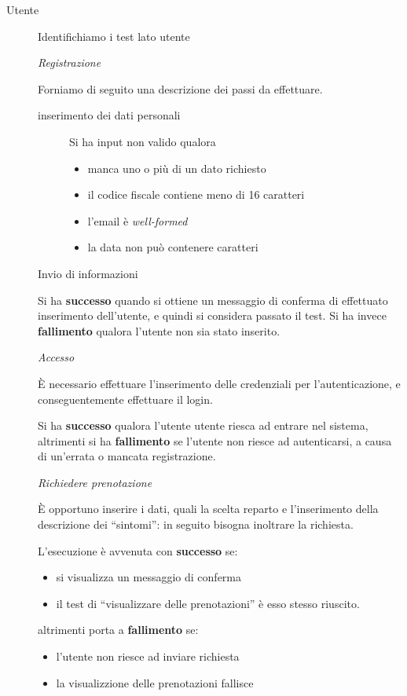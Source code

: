 \begin{description}
\item[Utente]

Identifichiamo i test lato utente

\begin{itemize}
 \diam \textit{Registrazione}
 
  Forniamo di seguito una descrizione dei passi da effettuare.
  \begin{description}
  
  \item[inserimento dei dati personali] Si ha input non valido qualora
  \begin{itemize}
  \item manca uno o più di un dato richiesto
  \item il codice fiscale contiene meno di 16 caratteri
  \item l'email è \textit{well-formed}
  \item la data non può contenere caratteri
  \end{itemize}
  \item[Invio di informazioni]
  \end{description}
  Si ha \textbf{successo} quando si ottiene un messaggio di conferma di effettuato
  inserimento dell'utente, e quindi si considera passato il test. Si ha invece
  \textbf{fallimento} qualora l'utente non sia stato inserito.


 \diam \textit{Accesso}

  È necessario effettuare l'inserimento delle credenziali per l'autenticazione,
  e conseguentemente effettuare il login.
  
  Si ha \textbf{successo} qualora l'utente utente riesca ad entrare nel sistema, 
  altrimenti si ha \textbf{fallimento} se l'utente non riesce ad autenticarsi, a causa
  di un'errata o mancata registrazione.                                      

 \diam \textit{Richiedere prenotazione}

  È opportuno inserire i dati, quali la scelta reparto
  e l'inserimento della descrizione dei ``sintomi'': in seguito bisogna
  inoltrare la richiesta. 
  
   L'esecuzione è avvenuta con \textbf{successo} se:
   \begin{itemize}
   \item si visualizza un messaggio di conferma
   \item il test di ``visualizzare delle prenotazioni'' è esso stesso riuscito.
   \end{itemize}
  altrimenti porta a \textbf{fallimento} se:
  \begin{itemize}
  \item l'utente non riesce ad inviare richiesta
  \item la visualizzione delle prenotazioni fallisce
  \end{itemize}
                                                                                                                                   


\end{itemize}
\end{description}
